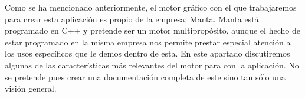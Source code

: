 Como se ha mencionado anteriormente, el motor gráfico con el que trabajaremos para crear esta aplicación es propio de la empresa: Manta. Manta está programado en C++ y pretende ser un motor multipropósito, aunque el hecho de estar programado en la misma empresa nos permite prestar especial atención a los usos específicos que le demos dentro de esta. En este apartado discutiremos algunas de las características más relevantes del motor para con la aplicación. No se pretende pues crear una documentación completa de este sino tan sólo una visión general.




